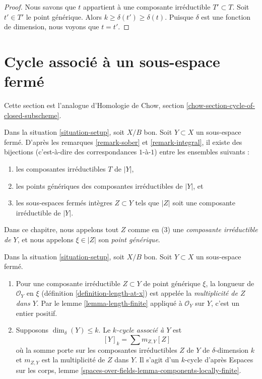 \begin{proof}
Nous savons que $t$ appartient à une composante irréductible $T' \subset T$.
Soit $t' \in T'$ le point générique. Alors $k \geq \delta(t') \geq \delta(t)$.
Puisque $\delta$ est une fonction de dimension, nous voyons que $t = t'$.
\end{proof}



\section{Cycle associé à un sous-espace fermé}
\label{section-cycle-of-closed-subscheme}

\noindent
Cette section est l'analogue d'Homologie de Chow, section
\ref{chow-section-cycle-of-closed-subscheme}.

\begin{remark}
\label{remark-irreducible-component}
Dans la situation \ref{situation-setup}, soit $X/B$ bon. Soit $Y
\subset X$ un sous-espace fermé. D'après les remarques \ref{remark-sober} et
\ref{remark-integral}, il existe des bijections (c'est-à-dire des
correspondances $1$-à-$1$) entre les ensembles suivants :
\begin{enumerate}
\item les composantes irréductibles $T$ de $|Y|$,
\item les points génériques des composantes irréductibles de $|Y|$, et
\item les sous-espaces fermés intègres $Z \subset Y$ tels que $|Z|$ soit une
composante irréductible de $|Y|$.
\end{enumerate}
Dans ce chapitre, nous appelons tout $Z$ comme en (3) une {\it composante
irréductible de $Y$}, et nous appelons $\xi \in |Z|$ son {\it point générique}.
\end{remark}

\begin{definition}
\label{definition-cycle-associated-to-closed-subscheme}
Dans la situation \ref{situation-setup}, soit $X/B$ bon. Soit $Y
\subset X$ un sous-espace fermé.
\begin{enumerate}
\item Pour une composante irréductible $Z \subset Y$ de point générique $\xi$,
la longueur de $\mathcal{O}_Y$ en $\xi$ (définition
\ref{definition-length-at-x}) est appelée la {\it multiplicité de $Z$ dans
$Y$}. Par le lemme \ref{lemma-length-finite} appliqué à $\mathcal{O}_Y$ sur
$Y$, c'est un entier positif.
\item Supposons $\dim_\delta(Y) \leq k$. Le {\it $k$-cycle associé à $Y$} est
$$
[Y]_k = \sum m_{Z, Y}[Z]
$$
où la somme porte sur les composantes irréductibles $Z$ de $Y$ de
$\delta$-dimension $k$ et $m_{Z, Y}$ est la multiplicité de $Z$ dans $Y$. Il
s'agit d'un $k$-cycle d'après Espaces sur les corps, lemme
\ref{spaces-over-fields-lemma-components-locally-finite}.
\end{enumerate}
\end{definition}

